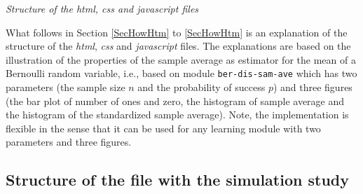 \documentclass[12pt]{article}
\begin{document}
\vspace{1em}
\noindent\emph{Structure of the \emph{html}, \emph{css} and \emph{javascript} files}

What follows in Section \ref{SecHowHtm} to \ref{SecHowHtm} is an explanation of the structure of the \emph{html}, \emph{css} and \emph{javascript} files.  
%
The explanations are based on the illustration of the properties of the sample average as estimator for the mean of a Bernoulli random variable, i.e., based on module \texttt{ber-dis-sam-ave} which has two parameters (the sample size $n$ and the probability of success $p$) and three figures (the bar plot of number of ones and zero, the histogram of sample average and the histogram of the standardized sample average). 
%
Note, the implementation is flexible in the sense that it can be used for any learning module with two parameters and three figures. 

\subsection{Structure of the file with the simulation study}\label{SecHowSim}

\end{document}
